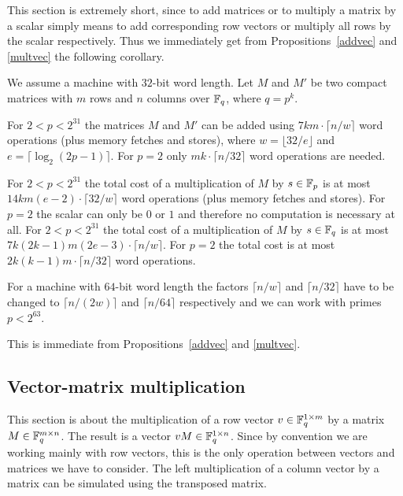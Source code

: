 This section is extremely short, since to add matrices or
to multiply a matrix by a scalar simply means to add corresponding
row vectors or multiply all rows by the scalar respectively.
Thus we immediately get from Propositions~\ref{addvec} and
\ref{multvec} the following corollary.

\begin{Cor}
We assume a machine with $32$-bit word length. Let $M$ and $M'$ be 
two compact matrices with $m$ rows and $n$ columns over $\mathbb{F}_q$, where $q
= p^k$.

For\/ $2 < p < 2^{31}$ the matrices $M$ and $M'$
can be added using $7km\cdot \lceil n/w \rceil$
word operations
(plus memory fetches and stores), where $w = \lfloor 32/e \rfloor$
and $e = \lceil \log_2(2p-1) \rceil$. 
For $p=2$ only $mk \cdot \lceil n/32 \rceil$ word operations are needed.

For\/ $2 < p < 2^{31}$ the total cost of a multiplication of
$M$ by $s \in \mathbb{F}_p$ is at most 
$14km(e-2)\cdot \lceil 32/w \rceil$ word operations (plus memory fetches
and stores). For $p=2$ the scalar
can only be $0$ or $1$ and therefore no computation is necessary at all.
For\/ $2 < p < 2^{31}$ the total cost of a multiplication of $M$
by $s \in \mathbb{F}_q$ is at most
$7k(2k-1)m(2e-3)\cdot \lceil n/w \rceil$.
 For $p = 2$ the total cost is
at most $2k(k-1)m \cdot \lceil n/32 \rceil$ word operations.

For a machine with $64$-bit word length the factors $\lceil n/w \rceil$
and $\lceil n/32 \rceil$ have to be changed to $\lceil n/(2w) \rceil$
and $\lceil n/64 \rceil$ respectively
and we can work with primes $p < 2^{63}$.
\end{Cor}
\Proof This is immediate from Propositions~\ref{addvec} and \ref{multvec}.
\ProofEnd

\subsection{Vector-matrix multiplication}
\label{ssec:vecmat}

This section is about the multiplication of a row vector 
$v \in \mathbb{F}_q^{1 \times m}$ by a matrix $M \in \mathbb{F}_q^{m \times n}$. The result
is a vector $vM \in \mathbb{F}_q^{1 \times n}$. Since by convention we are working 
mainly with row vectors, this is the only operation between vectors
and matrices we have to consider. The left multiplication of a column
vector by a matrix can be simulated using the transposed matrix.

